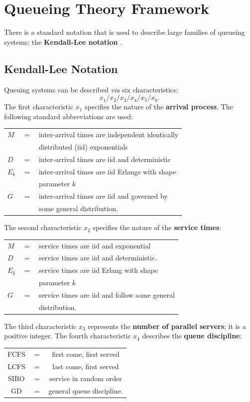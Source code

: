 
\section{Queueing Theory Framework}
There is a standard notation that is used to describe large families of queueing systems: the \textbf{Kendall-Lee notation} \cite{QS_K}.
\subsection{Kendall-Lee Notation}
Queuing systems can be described \textit{via} six characteristics: $$x_1/x_2/x_3/x_4/x_5/x_6.$$
The first characteristic $x_1$ specifies the nature of the \textbf{arrival process}. The following standard abbreviations are used:
\newl \begin{tabular}{p{0.25cm}p{0.25cm}p{15cm}}
$M$ &$=$& inter-arrival times are independent identically \\ & & \quad distributed (iid) exponentials\\
$D$ &$=$& inter-arrival times are iid and deterministic\\
$E_{k}$ &$=$& inter-arrival times are iid Erlangs with shape \\ & & \quad parameter $k$\\
$G$ &$=$& inter-arrival times are iid and governed by  \\ & & \quad some general distribution.
\end{tabular}
\newl
The second characteristic $x_2$ specifies the nature of the \textbf{service times}:
\newline \newline
\begin{tabular}{p{0.25cm}p{}p{12cm}}
$M$ &$=$& service times are iid and exponential\\
$D$ &$=$&  service times are iid and deterministic.\\
$E_{k}$ &$=$& service times are iid Erlang with shape \\ & & \quad parameter $k$\\
$G$ &$=$& service times are iid and follow some general \\ & & \quad distribution.
\end{tabular}
\newl
The third characteristic $x_3$ represents the \textbf{number of parallel servers}; it is a positive integer. \newl  The fourth characteristic $x_4$ describes the \textbf{queue discipline}:
\newl
\begin{tabular}{ccc}
FCFS &$=$& first come, first served\\
LCFS &$=$& last come, first served\\
SIRO &$=$& service in random order\\
GD &$=$& general queue discipline.
\end{tabular}
